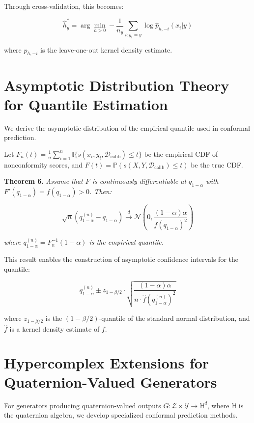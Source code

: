 \documentclass{article}
\theoremstyle{plain}
\theoremstyle{definition}
\theoremstyle{remark}
\begin{document}
Through cross-validation, this becomes:

\begin{equation}
\hat{h}^*_y = \arg\min_{h > 0} -\frac{1}{n_y} \sum_{i: y_i = y} \log \hat{p}_{h, -i}(x_i|y)
\end{equation}

where $\hat{p}_{h, -i}$ is the leave-one-out kernel density estimate.

\section{Asymptotic Distribution Theory for Quantile Estimation}

We derive the asymptotic distribution of the empirical quantile used in conformal prediction.

Let $F_n(t) = \frac{1}{n} \sum_{i=1}^n \mathbb{I}\{s(x_i, y_i, \mathcal{D}_{\text{calib}}) \leq t\}$ be the empirical CDF of nonconformity scores, and $F(t) = \mathbb{P}(s(X, Y, \mathcal{D}_{\text{calib}}) \leq t)$ be the true CDF.

\textbf{Theorem 6.} \textit{Assume that $F$ is continuously differentiable at $q_{1-\alpha}$ with $F'(q_{1-\alpha}) = f(q_{1-\alpha}) > 0$. Then:}

\begin{equation}
\sqrt{n}(q_{1-\alpha}^{(n)} - q_{1-\alpha}) \stackrel{d}{\rightarrow} \mathcal{N}\left(0, \frac{(1-\alpha)\alpha}{f(q_{1-\alpha})^2}\right)
\end{equation}

\textit{where $q_{1-\alpha}^{(n)} = F_n^{-1}(1-\alpha)$ is the empirical quantile.}

This result enables the construction of asymptotic confidence intervals for the quantile:

\begin{equation}
q_{1-\alpha}^{(n)} \pm z_{1-\beta/2} \cdot \sqrt{\frac{(1-\alpha)\alpha}{n \cdot \hat{f}(q_{1-\alpha}^{(n)})^2}}
\end{equation}

where $z_{1-\beta/2}$ is the $(1-\beta/2)$-quantile of the standard normal distribution, and $\hat{f}$ is a kernel density estimate of $f$.

\section{Hypercomplex Extensions for Quaternion-Valued Generators}

For generators producing quaternion-valued outputs $G: \mathcal{Z} \times \mathcal{Y} \rightarrow \mathbb{H}^d$, where $\mathbb{H}$ is the quaternion algebra, we develop specialized conformal prediction methods.
\end{document}
